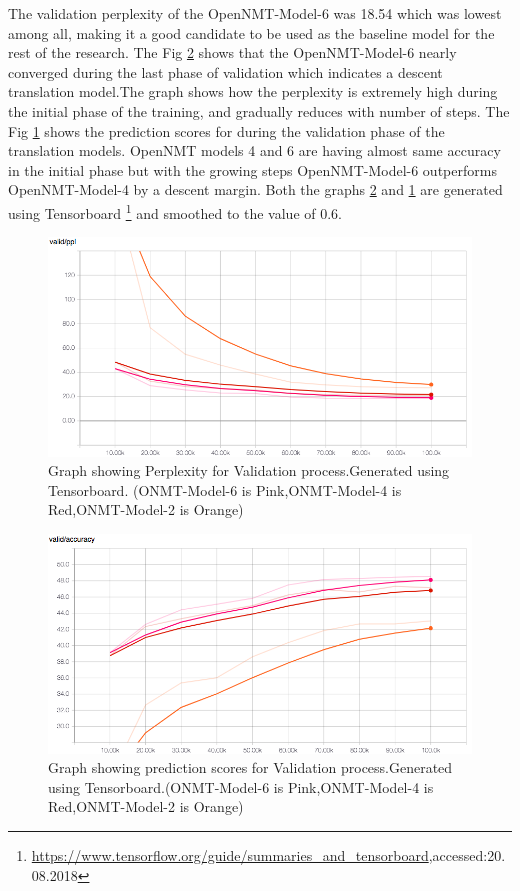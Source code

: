 The validation perplexity of the OpenNMT-Model-6 was 18.54 which was lowest among all, making it a good candidate to be used as the baseline model for the rest of the research. The Fig \ref{multibleu1} shows that the OpenNMT-Model-6 nearly converged during the last phase of validation which indicates a descent translation model.The graph shows how the perplexity is extremely high during the initial phase of the training, and gradually reduces with number of steps. The Fig \ref{multibleu2} shows the prediction scores for during the validation phase of the translation models. OpenNMT models 4 and 6 are having almost same accuracy in the initial phase but with the growing steps OpenNMT-Model-6 outperforms OpenNMT-Model-4 by a descent margin. Both the graphs \ref{multibleu1} and \ref{multibleu2} are generated using  Tensorboard \footnote{{\url{https://www.tensorflow.org/guide/summaries_and_tensorboard},accessed:20.08.2018}}  and smoothed to the value of 0.6. 

\begin{figure}[h]
\includegraphics[width=\textwidth]{graphs/graph1.png}
\caption{Graph showing Perplexity for Validation process.Generated using Tensorboard. (ONMT-Model-6 is Pink,ONMT-Model-4 is Red,ONMT-Model-2 is Orange)} 
\label{multibleu2}
\end{figure}

\begin{figure}[h]
\includegraphics[width=\textwidth]{graphs/graph2.png}
\caption{Graph showing prediction scores for Validation process.Generated using Tensorboard.(ONMT-Model-6 is Pink,ONMT-Model-4 is Red,ONMT-Model-2 is Orange)} 
\label{multibleu1}
\end{figure}

